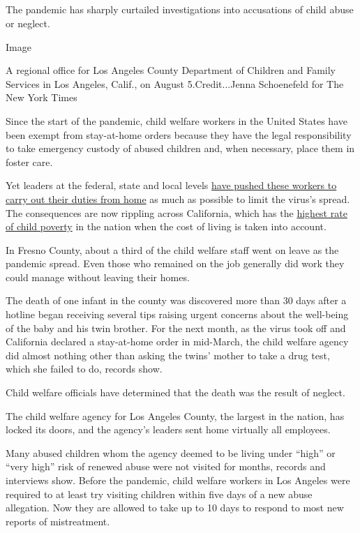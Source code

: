\hypertarget{section-8}{%
\subsection{}\label{section-8}}

The pandemic has sharply curtailed investigations into accusations of
child abuse or neglect.

Image

A regional office for Los Angeles County Department of Children and
Family Services in Los Angeles, Calif., on August 5.Credit...Jenna
Schoenefeld for The New York Times

Since the start of the pandemic, child welfare workers in the United
States have been exempt from stay-at-home orders because they have the
legal responsibility to take emergency custody of abused children and,
when necessary, place them in foster care.

Yet leaders at the federal, state and local levels
\href{https://www.nytimes3xbfgragh.onion/2020/08/07/us/virus-child-abuse.html}{have
pushed these workers to carry out their duties from home} as much as
possible to limit the virus's spread. The consequences are now rippling
across California, which has the
\href{https://edsource.org/2018/child-poverty-drops-in-california-but-is-still-the-nations-highest/596285}{highest
rate of child poverty} in the nation when the cost of living is taken
into account.

In Fresno County, about a third of the child welfare staff went on leave
as the pandemic spread. Even those who remained on the job generally did
work they could manage without leaving their homes.

The death of one infant in the county was discovered more than 30 days
after a hotline began receiving several tips raising urgent concerns
about the well-being of the baby and his twin brother. For the next
month, as the virus took off and California declared a stay-at-home
order in mid-March, the child welfare agency did almost nothing other
than asking the twins' mother to take a drug test, which she failed to
do, records show.

Child welfare officials have determined that the death was the result of
neglect.

The child welfare agency for Los Angeles County, the largest in the
nation, has locked its doors, and the agency's leaders sent home
virtually all employees.

Many abused children whom the agency deemed to be living under ``high''
or ``very high'' risk of renewed abuse were not visited for months,
records and interviews show. Before the pandemic, child welfare workers
in Los Angeles were required to at least try visiting children within
five days of a new abuse allegation. Now they are allowed to take up to
10 days to respond to most new reports of mistreatment.

